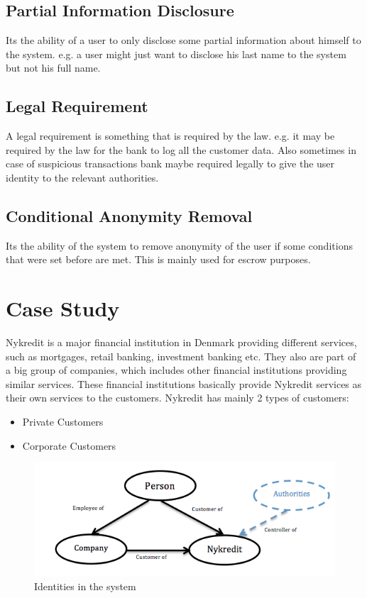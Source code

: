 \subsection{Partial Information Disclosure}
Its the ability of a user to only disclose some partial information about himself to the system. e.g. a user might just want to disclose his last name to the system but not his full name.
\subsection{Legal Requirement}
A legal requirement is something that is required by the law. e.g. it may be required by the law for the bank to log all the customer data. Also sometimes in case of suspicious transactions bank maybe required legally to give the user identity to the relevant authorities.
\subsection{Conditional Anonymity Removal}
Its the ability of the system to remove anonymity of the user if some conditions that were set before are met. This is mainly used for escrow purposes.

\section{Case Study}
Nykredit is a major financial institution in Denmark providing different services, such as mortgages, retail banking, investment banking etc. They also are part of a big group of companies, which includes other financial institutions providing similar services. These financial institutions basically provide Nykredit services as their own services to the customers.
Nykredit has mainly 2 types of customers:
\begin{itemize}
\item Private Customers
\item Corporate Customers
\end{itemize}
\begin{figure}[h]
	\centering
	\includegraphics[width=\textwidth]{figures/Customers}
	\caption{Identities in the system}
	\label{fig:Customers}
\end{figure}
